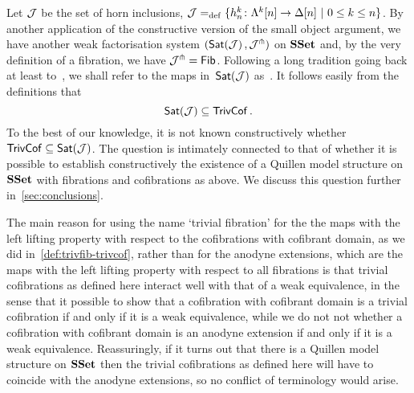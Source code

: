\documentclass[reqno,10pt,a4paper,oneside,draft]{amsart}
\begin{document}
\begin{remark} Let $\cal{J}$ be the set of horn inclusions, \ie $\cal{J} \defeq \{ h^k_n  \co \Lambda^k[n] \to \Delta[n]  \ | \ 0 \leq k \leq n \}$. By another application of the constructive version of the small object argument, we have another weak factorisation system $( \mathsf{Sat}(\cal{J}) \, , \cal{J}^\pitchfork)$ on $\SSet$ and, by the very definition of a fibration, we have $\cal{J}^\pitchfork = \Fib$. Following a long tradition going back at least to~\cite{gabriel-zisman:calculus-of-fractions}, we shall refer to the maps in~$\mathsf{Sat}(\cal{J})$ as~. It follows easily from the definitions that 
\[
  \mathsf{Sat}(\cal{J}) \subseteq \TrivCof  \, .
\]
To the best of our knowledge, it is not known constructively whether $\TrivCof \subseteq \Sat(\cal{J})$. The question is intimately connected to that of whether it is possible to establish constructively the existence of a
Quillen model structure on $\SSet$ with fibrations and cofibrations as above. We discuss this question further in~\cref{sec:conclusions}.

The main reason for using the name `trivial fibration' for the the maps with the left lifting property with respect to the cofibrations with cofibrant domain, as we did in~\cref{def:trivfib-trivcof}, rather than for the anodyne extensions, which are the maps with the left lifting property with respect to all fibrations is that
 trivial cofibrations as defined here interact well with that of a weak equivalence, in the sense that it
 possible to show that a  cofibration with cofibrant domain is a trivial cofibration if and only if it is a weak equivalence, while we do not not whether a cofibration with cofibrant domain is an anodyne extension if
 and only if it is a weak equivalence. Reassuringly, if it turns out that there is a Quillen model structure on $\SSet$ then the trivial cofibrations as defined here will have to coincide with the anodyne extensions, so no conflict of terminology would arise. 
 \end{remark}








\medskip





\medskip
\end{document}
